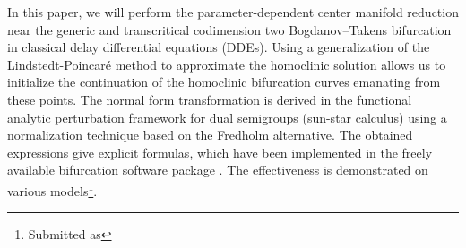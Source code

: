 In this paper{}, we will perform the parameter-dependent center manifold reduction
near the generic and transcritical codimension two Bogdanov--Takens bifurcation
in classical delay differential equations (DDEs). Using a generalization of the
Lindstedt-Poincar\'e method to approximate the homoclinic solution allows us to
initialize the continuation of the homoclinic bifurcation curves emanating from
these points. The normal form transformation is derived in the functional
analytic perturbation framework for dual semigroups (sun-star calculus) using a
normalization technique based on the Fredholm alternative. The obtained
expressions give explicit formulas, which have been implemented in the freely
available bifurcation software package \DDEBIFTOOL. The effectiveness is
demonstrated on various models\ifthesis\footnote{Submitted as}\fi.
